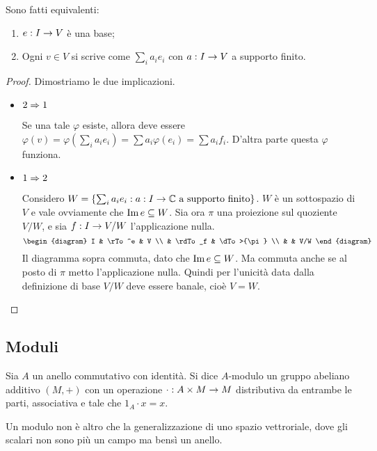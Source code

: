 \documentclass[a4paper,10pt,oneside]{math_article}
\renewcommand{\phi}{\varphi}
\begin{document}
      \begin{myprop}
       Sono fatti equivalenti:
       \begin{enumerate}
        \item $e: I \rightarrow V$ è una base;
        \item Ogni $v \in V$ si scrive come $\sum_i a_ie_i$ con $a: I\rightarrow V$ a supporto finito. 
       \end{enumerate}
      \end{myprop}
      \begin{proof}
        Dimostriamo le due implicazioni.
        \begin{itemize}
         \item $2\Rightarrow 1$
	  
	  Se una tale $\phi$ esiste, allora deve essere $\phi(v)=\phi(\sum_i a_i e_i) = \sum a_i \phi(e_i) = \sum a_i f_i$. D'altra parte questa $\phi$ funziona.
	 
         \item $1 \Rightarrow 2$
         
	  Considero $W = \{\sum_i a_ie_i : a:I\rightarrow \mathbb C \mbox{ a supporto finito}\}$. $W$ è un sottospazio di $V$ e vale ovviamente che $\operatorname{Im} e \subseteq W$. Sia ora $\pi$ una proiezione sul quoziente $V/W$, e sia $f: I \rightarrow V/W$ l'applicazione nulla.
	    \[
	      \begin{diagram}
	      I & \rTo^e  & V \\
		& \rdTo_f & \dTo>{\pi}   \\
		&         & V/W
	      \end{diagram}
	    \]
	  Il diagramma sopra commuta, dato che $\operatorname{Im} e \subseteq W$. Ma commuta anche se al posto di $\pi$ metto l'applicazione nulla. Quindi per l'unicità data dalla definizione di base $V/W$ deve essere banale, cioè $V=W$.
        \end{itemize}
      \end{proof}
     
    \subsection{Moduli}
      \begin{mydef}
       Sia $A$ un anello commutativo con identità. Si dice $A$-modulo un gruppo abeliano additivo $(M,+)$ con un operazione $\cdot: A\times M \rightarrow M$ distributiva da entrambe le parti, associativa e tale che $1_A \cdot x = x$.
      \end{mydef}
      
      Un modulo non è altro che la generalizzazione di uno spazio vettroriale, dove gli scalari non sono più un campo ma bensì un anello.
      
\end{document}
